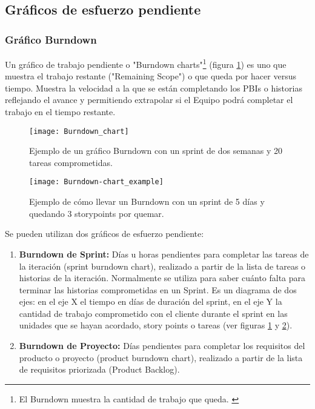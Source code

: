 \subsection{Gráficos de esfuerzo pendiente}

\subsubsection{Gráfico Burndown}

Un gráfico de trabajo pendiente o "Burndown charts"\footnote{El Burndown muestra la cantidad de trabajo que queda. \cite{SBOK-2013}} (figura \ref{fig:Burndown_chart}) es uno que muestra el trabajo restante ("Remaining Scope") o que queda por hacer versus tiempo. Muestra la velocidad a la que se están completando los PBIs o historias reflejando el avance y permitiendo extrapolar si el Equipo podrá completar el trabajo en el tiempo restante.

\begin{figure}[h]
  \centering
  \texttt{[image: Burndown\_chart]}
  \caption{Ejemplo de un gráfico Burndown con un sprint de dos semanas y 20 tareas comprometidas.}
  \centering
  \label{fig:Burndown_chart} %
\end{figure}

\begin{figure}[h]
  \centering
  \texttt{[image: Burndown-chart\_example]}
  \caption{Ejemplo de cómo llevar un Burndown con un sprint de 5 días y quedando 3 storypoints por quemar.}
  \centering
  \label{fig:Burndown-chart_example} %
\end{figure}

Se pueden utilizan dos gráficos de esfuerzo pendiente:

\begin{enumerate}

\item \textbf{Burndown de Sprint:} Días u horas pendientes para completar las tareas de la iteración (sprint burndown chart), realizado a partir de la lista de tareas o historias de la iteración. Normalmente se utiliza para saber cuánto falta para terminar las historias comprometidas en un Sprint. Es un diagrama de dos ejes: en el eje X el tiempo en días de duración del sprint, en el eje Y la cantidad de trabajo comprometido con el cliente durante el sprint en las unidades que se hayan acordado, story points o tareas (ver figuras \ref{fig:Burndown_chart} y \ref{fig:Burndown-chart_example}).

\item \textbf{Burndown de Proyecto:} Días pendientes para completar los requisitos del producto o proyecto (product burndown chart), realizado a partir de la lista de requisitos priorizada (Product Backlog).

\end{enumerate}

